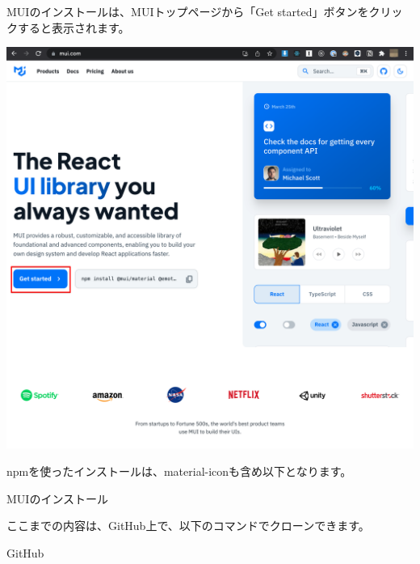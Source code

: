 MUIのインストールは、MUIトップページから「Get started」ボタンをクリックすると表示されます。

\begin{reviewimage}%
\includegraphics[width=0.5\maxwidth]{./images/03-todo-with-react/mui000-mui-top.png}%
\label{image:03-todo-with-react:mui000-mui-top}
\end{reviewimage}

npmを使ったインストールは、material{-}iconも含め以下となります。

\def\startercodeblockfontsize{}
\begin{starterterminal}[]{MUIのインストール}\end{starterterminal}
\begin{starternote}[]{}

ここまでの内容は、GitHub上で、以下のコマンドでクローンできます。

\def\startercodeblockfontsize{}
\begin{starterterminal}[]{GitHub}\end{starterterminal}
\end{starternote}

